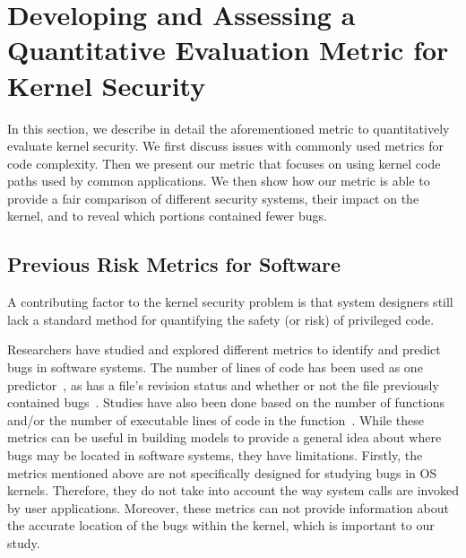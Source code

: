 \section{Developing and Assessing a Quantitative Evaluation Metric for
Kernel Security}
\label{sec.metric}


In this section, we describe in detail the aforementioned metric to 
quantitatively evaluate kernel security. We first discuss issues with
commonly used metrics for code complexity. Then we present our metric that
focuses on using kernel code paths used by common applications.  We
then show how our metric is able to provide a fair comparison of 
different security systems, their impact on the kernel, 
and to reveal which portions contained fewer bugs.

\subsection{Previous Risk Metrics for Software}

A contributing factor to the kernel security problem is that system
designers 
still lack a standard method for quantifying the safety (or risk) of
privileged code.   

Researchers have studied and explored different metrics to identify and
predict bugs in software systems. 
The number of lines of code has been used as one 
predictor~\cite{Bug-Location}, as has a file's revision status and 
whether or not the file previously contained bugs~\cite{Bug-Location, 
lewis2013does}. Studies have also been done based on 
the number of functions and/or the number of executable lines of code in
the function~\cite{Mining-Metrics}. 
While these metrics can be useful in building models to provide a general
idea about 
where bugs may be located in software systems, they have limitations. 
Firstly, the metrics mentioned above are not specifically designed for
studying bugs in OS kernels. 
Therefore, they do not take into account the way system calls are invoked
by user applications. 
Moreover, these metrics can not provide information about the accurate
location of the bugs within the kernel, 
which is important to our study.

